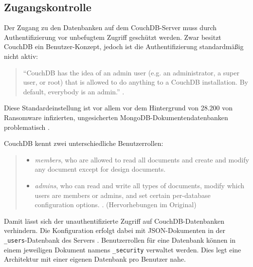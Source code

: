 \subsection{Zugangskontrolle}

Der Zugang zu den Datenbanken auf dem CouchDB-Server muss durch Authentifizierung vor unbefugtem Zugriff geschützt werden. Zwar besitzt CouchDB ein Benutzer-Konzept, jedoch ist die Authentifizierung standardmäßig nicht aktiv:

\begin{citeenv}
	\begin{quotation}
		"`CouchDB has the idea of an admin user (e.g. an administrator, a super user, or root) that is allowed to do anything to a CouchDB installation. By default, everybody is an admin."' \cite{couch:security}.
	\end{quotation}
\end{citeenv}

Diese Standardeinstellung ist vor allem vor dem Hintergrund von 28.200 von Ransomware infizierten, ungesicherten MongoDB-Dokumentendatenbanken problematisch \cite{bleepingcomputer:mongodb:security}.

CouchDB kennt zwei unterschiedliche Benutzerrollen:

\begin{citeenv}
	\begin{quotation}
		\begin{itemize}
			\item \textit{members}, who are allowed to read all documents and create and modify any document except for design documents.
			\item \textit{admins}, who can read and write all types of documents, modify which users are members or admins, and set certain per-database configuration options.  \cite{couch:security}. (Hervorhebungen im Original)
		\end{itemize}
	\end{quotation}
\end{citeenv}

Damit lässt sich der unauthentifizierte Zugriff auf CouchDB-Datenbanken verhindern. Die Konfiguration erfolgt dabei mit JSON-Dokumenten in der \texttt{\_users}-Datenbank des Servers \cite{couch:security}. Benutzerrollen für eine Datenbank können in einem jeweiligen Dokument namens \texttt{\_security} verwaltet werden. Dies legt eine Architektur mit einer eigenen Datenbank pro Benutzer nahe.